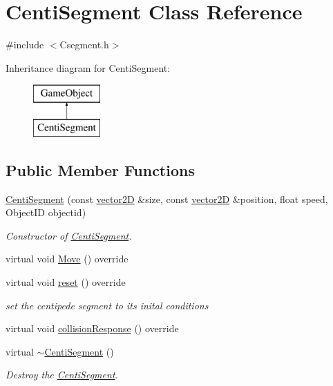 \hypertarget{class_centi_segment}{}\section{Centi\+Segment Class Reference}
\label{class_centi_segment}


{\ttfamily \#include $<$Csegment.\+h$>$}

Inheritance diagram for Centi\+Segment\+:\begin{figure}[H]
\begin{center}
\leavevmode
\includegraphics[height=2.000000cm]{class_centi_segment}
\end{center}
\end{figure}
\subsection*{Public Member Functions}
\begin{DoxyCompactItemize}
\item 
\mbox{\hyperlink{class_centi_segment_abfe286a4c657f151f8c149d88b94264c}{Centi\+Segment}} (const \mbox{\hyperlink{classvector2_d}{vector2D}} \&size, const \mbox{\hyperlink{classvector2_d}{vector2D}} \&position, float speed, Object\+ID objectid)
\begin{DoxyCompactList}\small\item\em Constructor of \mbox{\hyperlink{class_centi_segment}{Centi\+Segment}}. \end{DoxyCompactList}\item 
virtual void \mbox{\hyperlink{class_centi_segment_a7e1837a169b160e9a899504db13e4d2c}{Move}} () override
\item 
\mbox{\label{class_centi_segment_ac657402352ec1276c76edd6d282d9a43}} 
virtual void \mbox{\hyperlink{class_centi_segment_ac657402352ec1276c76edd6d282d9a43}{reset}} () override
\begin{DoxyCompactList}\small\item\em set the centipede segment to its inital conditions \end{DoxyCompactList}\item 
virtual void \mbox{\hyperlink{class_centi_segment_a9161d48372e6c547ad5d5c630af0bfe4}{collision\+Response}} () override
\item 
\mbox{\label{class_centi_segment_ae8b8e2a1e63374125b7f9913a8179e38}} 
virtual \mbox{\hyperlink{class_centi_segment_ae8b8e2a1e63374125b7f9913a8179e38}{$\sim$\+Centi\+Segment}} ()
\begin{DoxyCompactList}\small\item\em Destroy the \mbox{\hyperlink{class_centi_segment}{Centi\+Segment}}. \end{DoxyCompactList}\end{DoxyCompactItemize}
